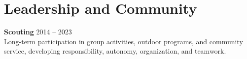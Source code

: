 \section{Leadership and Community}
\textbf{Scouting} \hfill 2014 -- 2023\\[-1pt]
Long-term participation in group activities, outdoor programs, and community service, developing responsibility, autonomy, organization, and teamwork.
